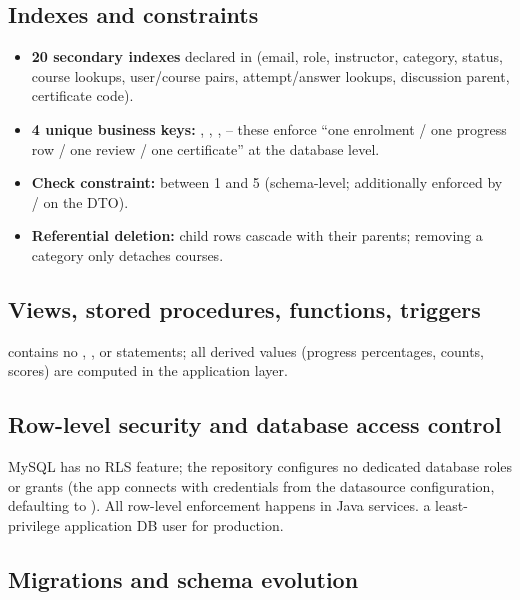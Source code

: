 \subsection{Indexes and constraints}

\begin{itemize}
    \item \textbf{20 secondary indexes} declared in  (email, role, instructor, category, status, course lookups, user/course pairs, attempt/answer lookups, discussion parent, certificate code).
    \item \textbf{4 unique business keys:} , , ,  -- these enforce ``one enrolment / one progress row / one review / one certificate'' at the database level.
    \item \textbf{Check constraint:}  between 1 and 5 (schema-level; additionally enforced by / on the DTO).
    \item \textbf{Referential deletion:} child rows cascade with their parents; removing a category only detaches courses.
\end{itemize}

\subsection{Views, stored procedures, functions, triggers}

 contains no , ,  or  statements; all derived values (progress percentages, counts, scores) are computed in the application layer.

\subsection{Row-level security and database access control}

MySQL has no RLS feature; the repository configures no dedicated database roles or grants (the app connects with credentials from the datasource configuration, defaulting to ). All row-level enforcement happens in Java services.  a least-privilege application DB user for production.

\subsection{Migrations and schema evolution}

